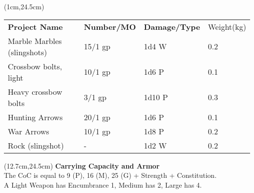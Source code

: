 \documentclass[a4paper,12 pt,openany]{book}
\begin{document}
\begin{textblock*}{11.5cm}(1cm,24.5cm) %

\begin{tabular}{llll}
\textbf{Project Name} & \textbf{Number/MO} & \textbf{Damage/Type} & Weight(kg) \\
Marble Marbles (slingshots) & 15/1 gp & 1d4 W & 0.2 \\
Crossbow bolts, light & 10/1 gp & 1d6 P & 0.1 \\
Heavy crossbow bolts & 3/1 gp & 1d10 P & 0.3 \\
Hunting Arrows & 20/1 gp & 1d6 P & 0.1 \\
War Arrows & 10/1 gp & 1d8 P & 0.2 \\
Rock (slingshot) & - & 1d2 W & 0.2 \\
\end{tabular}

\end{textblock*}

\begin{textblock*}{8cm}(12.7cm,24.5cm) %
\textbf{Carrying Capacity and Armor}\\
The CoC is equal to 9 (P), 16 (M), 25 (G) + Strength + Constitution.\\
A Light Weapon has Encumbrance 1, Medium has 2, Large has 4.
\end{textblock*}

~\newpage
\end{document}
